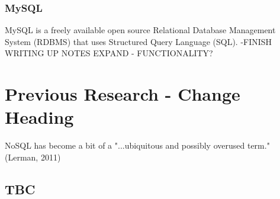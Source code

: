 \subsubsection{MySQL}\label{mysql}
MySQL is a freely available open source Relational Database Management System (RDBMS) that uses Structured Query Language (SQL). -FINISH WRITING UP NOTES
EXPAND - FUNCTIONALITY? 
\section{Previous Research - Change Heading}
NoSQL has become a bit of a "...ubiquitous and possibly overused term." (Lerman, 2011)
\subsection{TBC}